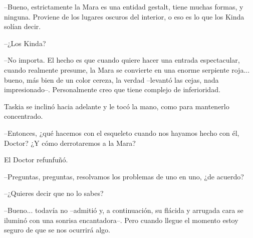--Bueno, estrictamente la Mara es una entidad gestalt, tiene muchas formas, y ninguna. Proviene de los lugares oscuros del interior, o eso es lo que los Kinda solían decir.

--¿Los Kinda?

--No importa. El hecho es que cuando quiere hacer una entrada espectacular, cuando realmente presume, la Mara se convierte en una enorme serpiente roja... bueno, más bien de un color cereza, la verdad --levantó las cejas, nada impresionado--. Personalmente creo que tiene complejo de inferioridad.

Taskia se inclinó hacia adelante y le tocó la mano, como para mantenerlo concentrado. 

--Entonces, ¿qué hacemos con el esqueleto cuando nos hayamos hecho con él, Doctor? ¿Y cómo derrotaremos a la Mara?

El Doctor refunfuñó. 

--Preguntas, preguntas, resolvamos los problemas de uno en uno, ¿de acuerdo?

--¿Quieres decir que no lo sabes?

--Bueno... todavía no --admitió y, a continuación, su flácida y arrugada cara se iluminó con una sonrisa encantadora--. Pero cuando llegue el momento estoy seguro de que se nos ocurrirá algo.
